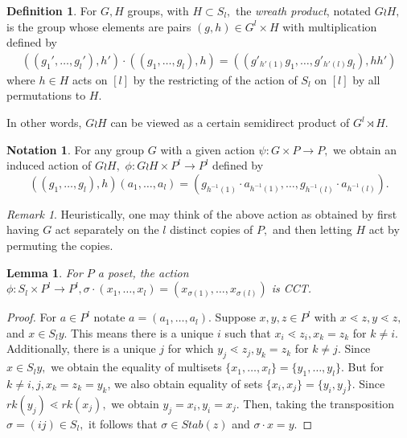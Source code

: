 \documentclass[10 pt]{amsart}
\theoremstyle{plain}
\newtheorem{lem}[thm]{Lemma}
\theoremstyle{definition}
\newtheorem{defn}[thm]{Definition}
\newtheorem{note}[thm]{Notation}
\theoremstyle{remark}
\newtheorem{rem}[thm]{Remark}
\numberwithin{equation}{section}
\begin{document}
\begin{defn}
For $G, H$ groups, with $H \subset S_l,$ the {\it wreath product}, notated $G \wr H,$ is the group whose elements are pairs $(g,h) \in G^l\times H$ with multiplication defined by
\begin{align*}
((g_1',\ldots, g_l'),h') \cdot ((g_1,\ldots, g_l) ,h) =((g'_{h'(1)}g_1,\ldots, g'_{h'(l)}g_l),hh')
\end{align*}
where $h \in H$ acts on $[l]$ by the restricting of the action of $S_l$ on $[l]$ by all permutations to $H.$
\end{defn}

In other words, $G\wr H$ can be viewed as a certain semidirect product of $G^l \rtimes H.$

\begin{note}
\label{note:wreath_action}
For any group $G$ with a given action $\psi:G\times P \rightarrow P,$ we obtain an induced action of $G \wr H,$ $\phi:G \wr H \times P^l \rightarrow P^l$ defined by 
$$((g_1,\ldots, g_l),h)(a_1,\ldots, a_l) = (g_{h^{-1}(1)}\cdot a_{h^{-1}(1)},\ldots,g_{h^{-1}(l)} \cdot a_{h^{-1}(l)}).$$
\end{note}

\begin{rem}
Heuristically, one may think of the above action as obtained by first having $G$ act separately on the $l$ distinct copies of $P,$ and then letting $H$ act by permuting the copies.
\end{rem}

\begin{lem}
\label{lem:symmetric_group_product_action}
For $P$ a poset, the action $\phi:S_l \times P^l \rightarrow P^l,\sigma \cdot(x_1,\ldots, x_l) = (x_{\sigma(1)},\ldots, x_{\sigma(l)})$ is CCT.
\end{lem}
\begin{proof}
For $a \in P^l$ notate $a = (a_1,\ldots, a_l).$ Suppose $x,y,z \in P^l$ with $x\lessdot z,y\lessdot z,$ and $x \in S_ly.$ This means there is a unique $i$ such that $x_i \lessdot z_i,x_k = z_k$ for $k \neq i.$ Additionally, there is a unique $j$ for which $y_j \lessdot z_j,y_k =z_k$ for $k \neq j.$ Since $x \in S_ly,$ we obtain the equality of multisets $\{x_1,\ldots, x_l\}=\{y_1,\ldots,y_l\}.$ But for $k \neq i,j,x_k = z_k = y_k$, we also obtain equality of sets $\{x_i,x_j\} = \{y_i,y_j\}.$ Since $rk(y_j) \lessdot rk(x_j),$ we obtain $y_j = x_i,y_i = x_j.$ Then, taking the transposition $\sigma  = (ij) \in S_l,$ it follows that $\sigma \in Stab(z)$ and $\sigma \cdot x = y.$
\end{proof}
\end{document}
